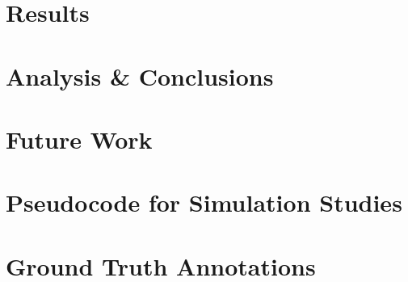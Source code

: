 \documentclass{uvamscse}	%
\begin{document}



\chapter{Results}
\label{results}




\chapter{Analysis \& Conclusions}




\chapter{Future Work}




\printbibliography

\appendix
{}


\chapter{Pseudocode for Simulation Studies}




\chapter{Ground Truth Annotations}
\label{groundtruth}



\end{document}
